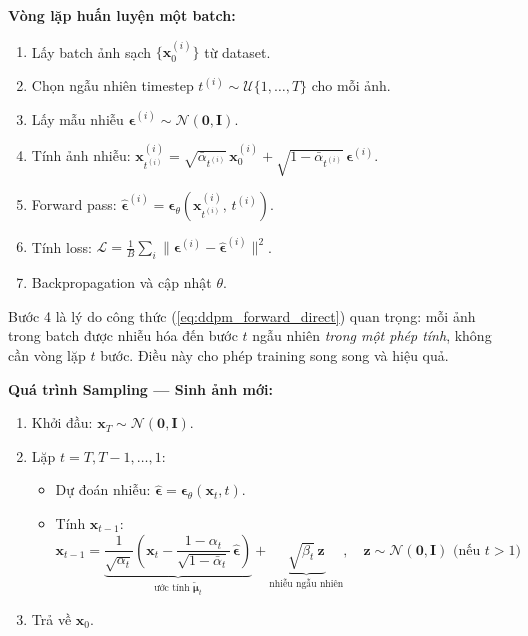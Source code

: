 \textbf{Vòng lặp huấn luyện một batch:}
\begin{enumerate}
    \item Lấy batch ảnh sạch $\{\mathbf{x}_0^{(i)}\}$ từ dataset.
    \item Chọn ngẫu nhiên timestep $t^{(i)} \sim \mathcal{U}\{1,\ldots,T\}$ cho mỗi ảnh.
    \item Lấy mẫu nhiễu $\boldsymbol{\epsilon}^{(i)} \sim \mathcal{N}(\mathbf{0},\mathbf{I})$.
    \item Tính ảnh nhiễu: $\mathbf{x}_{t^{(i)}}^{(i)} = \sqrt{\bar{\alpha}_{t^{(i)}}}\,\mathbf{x}_0^{(i)} + \sqrt{1-\bar{\alpha}_{t^{(i)}}}\,\boldsymbol{\epsilon}^{(i)}$.
    \item Forward pass: $\hat{\boldsymbol{\epsilon}}^{(i)} = \boldsymbol{\epsilon}_\theta(\mathbf{x}_{t^{(i)}}^{(i)},\, t^{(i)})$.
    \item Tính loss: $\mathcal{L} = \frac{1}{B}\sum_i \|\boldsymbol{\epsilon}^{(i)} - \hat{\boldsymbol{\epsilon}}^{(i)}\|^2$.
    \item Backpropagation và cập nhật $\theta$.
\end{enumerate}

Bước 4 là lý do công thức (\ref{eq:ddpm_forward_direct}) quan trọng: mỗi ảnh trong batch được nhiễu hóa đến bước $t$ ngẫu nhiên \textit{trong một phép tính}, không cần vòng lặp $t$ bước. Điều này cho phép training song song và hiệu quả.

\textbf{Quá trình Sampling --- Sinh ảnh mới:}
\begin{enumerate}
    \item Khởi đầu: $\mathbf{x}_T \sim \mathcal{N}(\mathbf{0},\mathbf{I})$.
    \item Lặp $t = T, T-1, \ldots, 1$:
    \begin{itemize}
        \item Dự đoán nhiễu: $\hat{\boldsymbol{\epsilon}} = \boldsymbol{\epsilon}_\theta(\mathbf{x}_t, t)$.
        \item Tính $\mathbf{x}_{t-1}$:
        \[
            \mathbf{x}_{t-1} = \underbrace{\frac{1}{\sqrt{\alpha_t}}\!\left(\mathbf{x}_t - \frac{1-\alpha_t}{\sqrt{1-\bar{\alpha}_t}}\,\hat{\boldsymbol{\epsilon}}\right)}_{\text{ước tính } \tilde{\boldsymbol{\mu}}_t} + \underbrace{\sqrt{\beta_t}\,\mathbf{z}}_{\text{nhiễu ngẫu nhiên}}, \quad \mathbf{z} \sim \mathcal{N}(\mathbf{0},\mathbf{I}) \text{ (nếu }t>1\text{)}
        \]
    \end{itemize}
    \item Trả về $\mathbf{x}_0$.
\end{enumerate}

